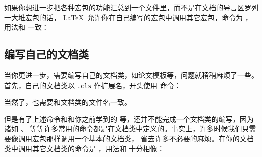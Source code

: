 如果你想进一步把各种宏包的功能汇总到一个文件里，而不是在文档的导言区罗列一大堆宏包的话，
\LaTeX\ 允许你在自己编写的宏包中调用其它宏包，命令为 ，用法和 
一致：
\begin{command}
\end{command}

\subsection{编写自己的文档类}

当你更进一步，需要编写自己的文档类，如论文模板等，问题就稍稍麻烦了一些。首先，自己的文档类以 \texttt{.cls} 作扩展名，开头使用
 命令：
\begin{command}
\end{command}
当然了，也需要和文档类的文件名一致。

但是有了上述命令和和你之前学到的  等，还并不能完成一个文档类的编写，因为诸如 、
 等等许多常用的命令都是在文档类中定义的。事实上，许多时候我们只需要像调用宏包那样调用一个基本的文档类，
省去许多不必要的麻烦。在你的文档类中调用其它文档类的命令是  ，用法和  十分相像：
\begin{command}
\end{command}

\endinput